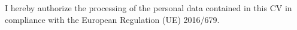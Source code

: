 \begin{cvparagraph}
    \begin{center}
        I hereby authorize the processing of the personal data contained in this CV in compliance with the European Regulation (UE) 2016/679.
    \end{center}
    
\end{cvparagraph}
